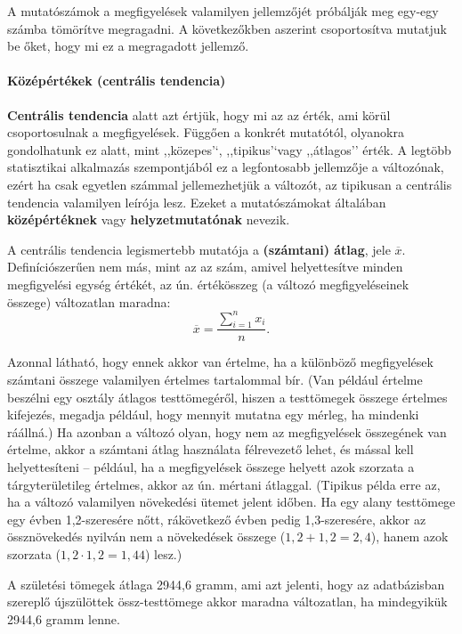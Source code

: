 \documentclass[]{book}
\let\oldparagraph\paragraph
\renewcommand{\paragraph}[1]{\oldparagraph{#1}\mbox{}}
\begin{document}
A mutatószámok a megfigyelések valamilyen jellemzőjét próbálják meg
egy-egy számba tömörítve megragadni. A következőkben aszerint
csoportosítva mutatjuk be őket, hogy mi ez a megragadott jellemző.

\paragraph{Középértékek (centrális
tendencia)}\label{deskriptivmennyegyvaltanalitikusmutatoszamokcentralistendencia}

\textbf{Centrális tendencia} alatt azt értjük, hogy mi az az érték, ami
körül csoportosulnak a megfigyelések. Függően a konkrét mutatótól,
olyanokra gondolhatunk ez alatt, mint ,,közepes'`, ,,tipikus'`vagy
,,átlagos'' érték. A legtöbb statisztikai alkalmazás szempontjából ez a
legfontosabb jellemzője a változónak, ezért ha csak egyetlen számmal
jellemezhetjük a változót, az tipikusan a centrális tendencia valamilyen
leírója lesz. Ezeket a mutatószámokat általában \textbf{középértéknek}
vagy \textbf{helyzetmutatónak} nevezik.

A centrális tendencia legismertebb mutatója a \textbf{(számtani) átlag},
jele \(\overline{x}\). Definíciószerűen nem más, mint az az szám, amivel
helyettesítve minden megfigyelési egység értékét, az ún. értékösszeg (a
változó megfigyeléseinek összege) változatlan maradna: \[
    \overline{x}=\frac{\sum_{i=1}^n x_i}{n}.
\]

Azonnal látható, hogy ennek akkor van értelme, ha a különböző
megfigyelések számtani összege valamilyen értelmes tartalommal bír. (Van
például értelme beszélni egy osztály átlagos testtömegéről, hiszen a
testtömegek összege értelmes kifejezés, megadja például, hogy mennyit
mutatna egy mérleg, ha mindenki ráállná.) Ha azonban a változó olyan,
hogy nem az megfigyelések összegének van értelme, akkor a számtani átlag
használata félrevezető lehet, és mással kell helyettesíteni -- például,
ha a megfigyelések összege helyett azok szorzata a tárgyterületileg
értelmes, akkor az ún. mértani átlaggal. (Tipikus példa erre az, ha a
változó valamilyen növekedési ütemet jelent időben. Ha egy alany
testtömege egy évben 1,2-szeresére nőtt, rákövetkező évben pedig
1,3-szeresére, akkor az össznövekedés nyilván nem a növekedések összege
(\(1,\!2 + 1,\!2 = 2,\!4\)), hanem azok szorzata
(\(1,\!2 \cdot 1,\!2 = 1,\!44\)) lesz.)

A születési tömegek átlaga 2944,6 gramm, ami azt jelenti, hogy az
adatbázisban szereplő újszülöttek össz-testtömege akkor maradna
változatlan, ha mindegyikük 2944,6 gramm lenne.
\end{document}
